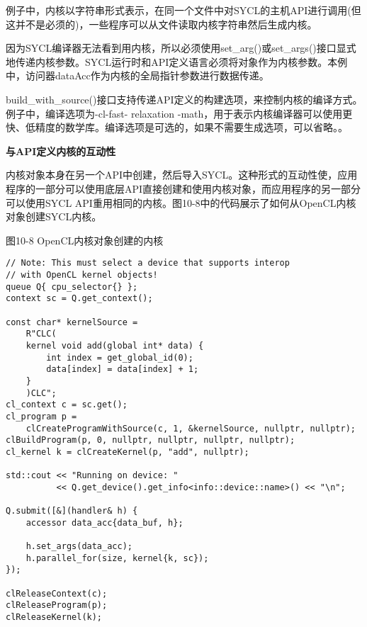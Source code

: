 例子中，内核以字符串形式表示，在同一个文件中对SYCL的主机API进行调用(但这并不是必须的)，一些程序可以从文件读取内核字符串然后生成内核。\par

因为SYCL编译器无法看到用内核，所以必须使用set\_arg()或set\_args()接口显式地传递内核参数。SYCL运行时和API定义语言必须将对象作为内核参数。本例中，访问器dataAcc作为内核的全局指针参数进行数据传递。\par

build\_with\_source()接口支持传递API定义的构建选项，来控制内核的编译方式。例子中，编译选项为-cl-fast- relaxation -math，用于表示内核编译器可以使用更快、低精度的数学库。编译选项是可选的，如果不需要生成选项，可以省略。。\par

\hspace*{\fill} \par %
\textbf{与API定义内核的互动性}

内核对象本身在另一个API中创建，然后导入SYCL。这种形式的互动性使，应用程序的一部分可以使用底层API直接创建和使用内核对象，而应用程序的另一部分可以使用SYCL API重用相同的内核。图10-8中的代码展示了如何从OpenCL内核对象创建SYCL内核。\par

\hspace*{\fill} \par %
图10-8 OpenCL内核对象创建的内核
\begin{lstlisting}[caption={}]
// Note: This must select a device that supports interop 
// with OpenCL kernel objects!
queue Q{ cpu_selector{} };
context sc = Q.get_context();

const char* kernelSource =
	R"CLC(
	kernel void add(global int* data) {
		int index = get_global_id(0);
		data[index] = data[index] + 1;
	}
	)CLC";
cl_context c = sc.get();
cl_program p =
	clCreateProgramWithSource(c, 1, &kernelSource, nullptr, nullptr);
clBuildProgram(p, 0, nullptr, nullptr, nullptr, nullptr);
cl_kernel k = clCreateKernel(p, "add", nullptr);

std::cout << "Running on device: "
	 	  << Q.get_device().get_info<info::device::name>() << "\n";
	 	  
Q.submit([&](handler& h) {
	accessor data_acc{data_buf, h};
	
	h.set_args(data_acc);
	h.parallel_for(size, kernel{k, sc});
});

clReleaseContext(c);
clReleaseProgram(p);
clReleaseKernel(k);
\end{lstlisting}

